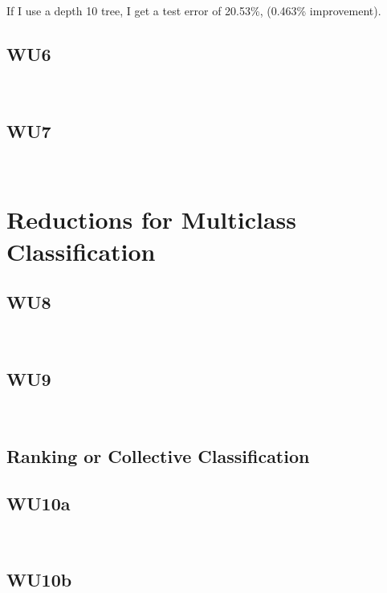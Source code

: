 \documentclass[a4paper,11pt]{article}
\begin{document}
If I use a depth 10 tree, I get a test error of 20.53\%, (0.463\%
improvement).

\subsection{WU6}
\textsf{}\\

\subsection{WU7}
\textsf{}\\

\section{Reductions for Multiclass Classification}
\subsection{WU8}
\textsf{}\\

\subsection{WU9}
\textsf{}\\

\subsection{Ranking or Collective Classification}
\subsection{WU10a}
\textsf{}\\


\subsection{WU10b}
\textsf{}\\



      
\end{document}
